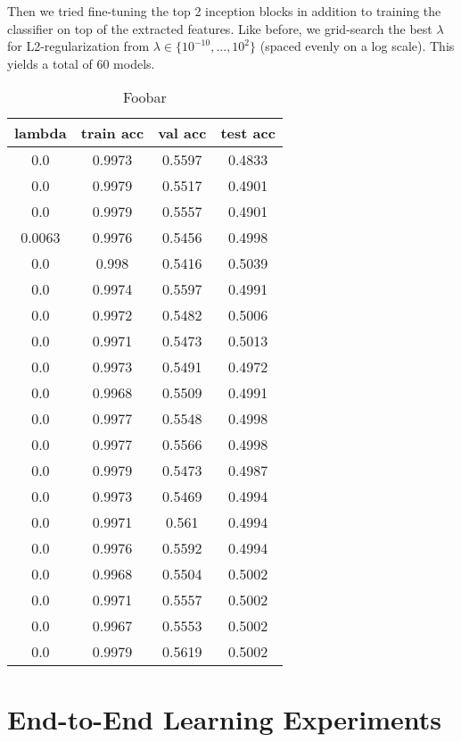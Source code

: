Then we tried fine-tuning the top 2 inception blocks in addition to training the classifier on top of the extracted features. Like before, we grid-search the best $\lambda$ for L2-regularization from $\lambda \in \{10^{-10}, ..., 10^{2}\}$ (spaced evenly on a log scale). This yields a total of $60$ models.

\begin{table}[ht]
\centering \begin{tabular}{ |c|c|c|c| }
\hline
lambda & train acc & val acc & test acc \\
\hline
0.0 & 0.9973 & 0.5597 & 0.4833 \\
0.0 & 0.9979 & 0.5517 & 0.4901 \\
0.0 & 0.9979 & 0.5557 & 0.4901 \\
0.0063 & 0.9976 & 0.5456 & 0.4998 \\
0.0 & 0.998 & 0.5416 & 0.5039 \\
0.0 & 0.9974 & 0.5597 & 0.4991 \\
0.0 & 0.9972 & 0.5482 & 0.5006 \\
0.0 & 0.9971 & 0.5473 & 0.5013 \\
0.0 & 0.9973 & 0.5491 & 0.4972 \\
0.0 & 0.9968 & 0.5509 & 0.4991 \\
0.0 & 0.9977 & 0.5548 & 0.4998 \\
0.0 & 0.9977 & 0.5566 & 0.4998 \\
0.0 & 0.9979 & 0.5473 & 0.4987 \\
0.0 & 0.9973 & 0.5469 & 0.4994 \\
0.0 & 0.9971 & 0.561 & 0.4994 \\
0.0 & 0.9976 & 0.5592 & 0.4994 \\
0.0 & 0.9968 & 0.5504 & 0.5002 \\
0.0 & 0.9971 & 0.5557 & 0.5002 \\
0.0 & 0.9967 & 0.5553 & 0.5002 \\
0.0 & 0.9979 & 0.5619 & 0.5002 \\
\hline
\end{tabular}
\caption{Foobar}
\label{table:foobar}
\end{table}













\section{End-to-End Learning Experiments}

